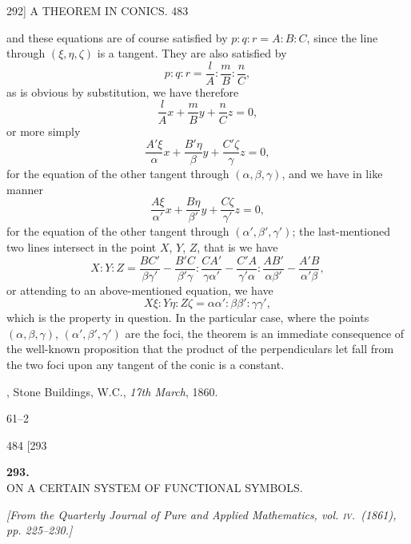 \documentclass[11pt]{article}
\begin{document}
\newpage
\begin{center}
\textsc{292]} \hfill A THEOREM IN CONICS. \hfill 483
\end{center}

and these equations are of course satisfied by $p:q:r=A:B:C$, since the line
through $(\xi,\eta,\zeta)$ is a tangent. They are also satisfied by
\[ p:q:r = \dfrac{l}{A} : \dfrac{m}{B} : \dfrac{n}{C}, \]
as is obvious by substitution, we have therefore
\[ \dfrac{l}{A}x+\dfrac{m}{B}y+\dfrac{n}{C}z=0, \]
or more simply
\[ \dfrac{A'\xi}{\alpha}x+\dfrac{B'\eta}{\beta}y+\dfrac{C'\zeta}{\gamma}z=0, \]
for the equation of the other tangent through $(\alpha,\beta,\gamma)$, and we have in like manner
\[ \dfrac{A\xi}{\alpha'}x+\dfrac{B\eta}{\beta'}y+\dfrac{C\zeta}{\gamma'}z=0, \]
for the equation of the other tangent through $(\alpha',\beta',\gamma')$; the last-mentioned two lines
intersect in the point $X$, $Y$, $Z$, that is we have
\[ X : Y : Z = \dfrac{BC'}{\beta\gamma'}-\dfrac{B'C}{\beta'\gamma} : \dfrac{CA'}{\gamma\alpha'}-\dfrac{C'A}{\gamma'\alpha} : \dfrac{AB'}{\alpha\beta'}-\dfrac{A'B}{\alpha'\beta}, \]
or attending to an above-mentioned equation, we have
\[ X\xi : Y\eta : Z\zeta = \alpha\alpha' : \beta\beta' : \gamma\gamma', \]
which is the property in question. In the particular case, where the points $(\alpha,\beta,\gamma)$,
$(\alpha',\beta',\gamma')$ are the foci, the theorem is an immediate consequence of the well-known
proposition that the product of the perpendiculars let fall from the two foci upon
any tangent of the conic is a constant.

\medskip
{}, Stone Buildings, W.C., \textit{17th March}, 1860.

\medskip
\hfill 61--2\hfill\hfill

\newpage
\begin{center}
484 \hfill \hfill \textsc{[293}
\end{center}

\begin{center}
\textbf{\large 293.}\\[1ex]
\textsc{ON A CERTAIN SYSTEM OF FUNCTIONAL SYMBOLS.}
\end{center}

\begin{center}
\textit{[From the Quarterly Journal of Pure and Applied Mathematics, vol. \textsc{iv}.\ (1861),
pp. 225--230.]}
\end{center}
\end{document}
